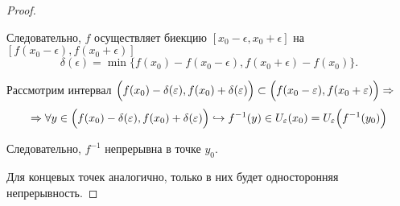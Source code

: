 \begin{proof}
\begin{center}
{
}
\end{center}
    
    Следовательно, $f$ осуществляет биекцию $[x_{0} - \epsilon, x_{0} + \epsilon]$ на  $[f(x_{0} - \epsilon), f(x_{0} + \epsilon)]$
    $$ \delta(\epsilon) = \min \{ f(x_{0}) - f(x_{0} - \epsilon), f(x_{0} + \epsilon) - f(x_{0})\}.
    $$

    Рассмотрим интервал $\Bigl( f(x_{0}) - \delta(\epsilon), f(x_{0}) + \delta(\epsilon) \Bigr) \subset \Bigl( f(x_{0} - \epsilon), f(x_{0} + \epsilon) \Bigr) \Rightarrow$
    $$\Rightarrow
    \forall y \in \Bigl( f(x_{0}) - \delta(\epsilon), f(x_{0}) + \delta(\epsilon) \Bigr) \hookrightarrow f^{-1}(y) \in U_{\epsilon}(x_{0}) = U_{\epsilon}\Bigl(f^{-1}(y_{0})\Bigr)
    $$
    
    Следовательно, $f^{-1}$ непрерывна в точке $y_{0}$.

    Для концевых точек аналогично, только в них будет односторонняя непрерывность.
\end{proof}

